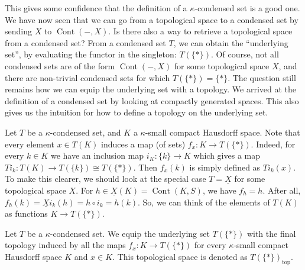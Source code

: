 \documentclass{article}
\DeclareMathOperator{\Cont}{Cont}
\renewcommand{\top}{\textrm{top}}
\begin{document}
This gives some confidence that the definition of a $\kappa$-condensed set
is a good one. We have now seen that we can go from a topological space
to a condensed set by sending $X$ to $\Cont(- ,X)$. Is there also a way
to retrieve a topological space from a condensed set?
From a condensed set $T$, we can obtain the ``underlying set'', by evaluating
the functor in the singleton: $T(\{*\})$. Of course, not all condensed sets
are of the form $\Cont(-, X)$ for some topological space $X$, and there are
non-trivial condensed sets for which $T(\{*\}) = \{*\}$.
The question still remains how we can equip the underlying
set with a topology. We arrived at the definition of a
condensed set by looking at compactly
generated spaces. This also gives us the intuition for how to
define a topology on the underlying set.

Let $T$ be a $\kappa$-condensed
set, and $K$ a $\kappa$-small compact Hausdorff space. Note that every
element $x \in T(K)$ induces a map (of sets) $f_x \colon K \to T(\{*\})$. Indeed,
for every $k\in K$ we have an inclusion map $i_K \colon \{k\} \to K$
which gives a map $Ti_k \colon T(K) \to T(\{k\}) \cong T(\{*\})$. Then
$f_x(k)$ is simply defined as $Ti_k(x)$. To make this clearer, we should
look at the special case $T = \underline{X}$ for some topological space
$X$. For $h\in \underline{X}(K) = \Cont(K , S)$, we have $f_h = h$.
After all, $f_h(k) = \underline{X}i_k(h) = h\circ i_k = h(k)$.
So, we can think of the elements of $T(K)$ as functions $K \to T(\{*\})$.
\begin{definition}
    Let $T$ be a $\kappa$-condensed set. We equip the underlying set $T(\{*\})$
    with the final topology induced by all the maps $f_x \colon K \to T(\{*\})$
    for every $\kappa$-small compact Hausdorff space $K$ and $x\in K$.
    This topological space is denoted as $T(\{*\})_\top$.
\end{definition}
\end{document}
